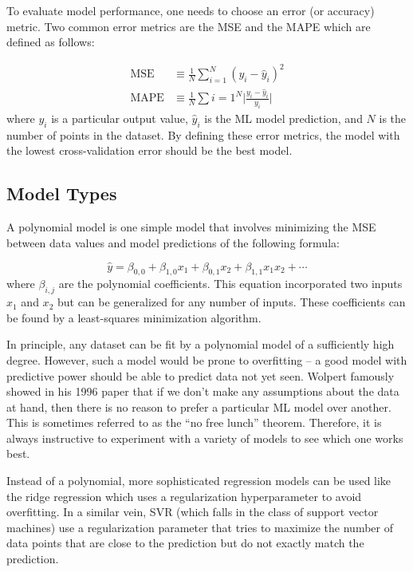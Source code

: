 To evaluate model performance, one needs to choose an error (or accuracy) metric. Two common error metrics are the \gls{MSE} and the \gls{MAPE} which are defined as follows: 

\begin{align}
	\text{MSE} &\equiv  \frac{1}{N} \sum_{i=1}^N (y_i - \hat{y}_i)^2 \\
	\text{MAPE} &\equiv \frac{1}{N} \sum{i=1}^N \lvert \frac{y_i - \hat{y}_i}{y_i} \rvert
\end{align}
where $y_i$ is a particular output value, $\hat{y}_i$ is the \gls{ML} model prediction, and $N$ is the number of points in the dataset. By defining these error metrics, the model with the lowest cross-validation error should be the best model. 

\subsection{Model Types}

A polynomial model is one simple model that involves minimizing the \gls{MSE} between data values and model predictions of the following formula: 

\begin{equation}
	\hat{y} = \beta_{0,0} + \beta_{1,0} x_1 + \beta_{0,1} x_2 + \beta_{1,1} x_1 x_2 + \cdots
\end{equation}
where $\beta_{i,j}$ are the polynomial coefficients. This equation incorporated two inputs $x_1$ and $x_2$ but can be generalized for any number of inputs. These coefficients can be found by a least-squares minimization algorithm. 

In principle, any dataset can be fit by a polynomial model of a sufficiently high degree. However, such a model would be prone to overfitting -- a good model with predictive power should be able to predict data not yet seen. Wolpert \cite{Wolpert_1997_IEEE} famously showed in his 1996 paper that if we don't make any assumptions about the data at hand, then there is no reason to prefer a particular \gls{ML} model over another. This is sometimes referred to as the ``no free lunch'' theorem. Therefore, it is always instructive to experiment with a variety of models to see which one works best. 

Instead of a polynomial, more sophisticated regression models can be used like the ridge regression which uses a regularization hyperparameter to avoid overfitting. In a similar vein, \gls{SVR} (which falls in the class of support vector machines) use a regularization parameter that tries to maximize the number of data points that are close to the prediction but do not exactly match the prediction. 

